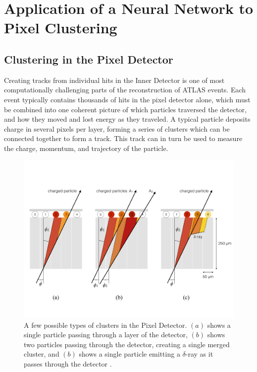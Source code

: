 
\chapter{Application of a Neural Network to Pixel Clustering} %

\label{sec:NN} %



\section{Clustering in the Pixel Detector}

Creating tracks from individual hits in the Inner Detector is one of most computationally challenging parts of the reconstruction of \ac{ATLAS} events. Each event typically contains thousands of hits in the pixel detector alone, which must be combined into one coherent picture of which particles traversed the detector, and how they moved and lost energy as they traveled. A typical particle deposits charge in several pixels per layer, forming a series of clusters which can be connected together to form a track. This track can in turn be used to measure the charge, momentum, and trajectory of the particle. 


\begin{centering}
\begin{figure}[bth]
\myfloatalign
\includegraphics[width=.90\linewidth]{figures/nn/cluster_types.pdf}
\caption{A few possible types of clusters in the Pixel Detector. $(a)$ shows a single particle passing through a layer of the detector, $(b)$ shows two particles passing through the detector, creating a single merged cluster, and $(b)$ shows a single particle emitting a $\delta$-ray as it passes through the detector \cite{PERF-2012-05}.}
\label{fig:cluster_types}
\end{figure}
\end{centering}

